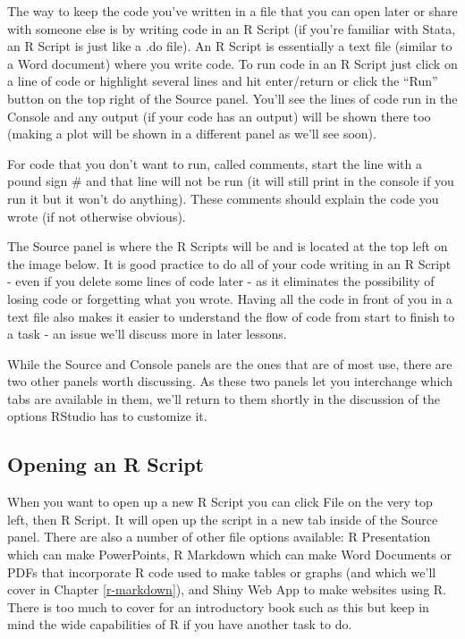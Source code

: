 \documentclass[
  12pt,
]{book}
\begin{document}
The way to keep the code you've written in a file that you can open later or share with someone else is by writing code in an R Script (if you're familiar with Stata, an R Script is just like a .do file). An R Script is essentially a text file (similar to a Word document) where you write code. To run code in an R Script just click on a line of code or highlight several lines and hit enter/return or click the ``Run'' button on the top right of the Source panel. You'll see the lines of code run in the Console and any output (if your code has an output) will be shown there too (making a plot will be shown in a different panel as we'll see soon).

For code that you don't want to run, called comments, start the line with a pound sign \# and that line will not be run (it will still print in the console if you run it but it won't do anything). These comments should explain the code you wrote (if not otherwise obvious).

The Source panel is where the R Scripts will be and is located at the top left on the image below. It is good practice to do all of your code writing in an R Script - even if you delete some lines of code later - as it eliminates the possibility of losing code or forgetting what you wrote. Having all the code in front of you in a text file also makes it easier to understand the flow of code from start to finish to a task - an issue we'll discuss more in later lessons.

While the Source and Console panels are the ones that are of most use, there are two other panels worth discussing. As these two panels let you interchange which tabs are available in them, we'll return to them shortly in the discussion of the options RStudio has to customize it.

\hypertarget{opening-an-r-script}{%
\subsection{Opening an R Script}\label{opening-an-r-script}}

When you want to open up a new R Script you can click File on the very top left, then R Script. It will open up the script in a new tab inside of the Source panel. There are also a number of other file options available: R Presentation which can make PowerPoints, R Markdown which can make Word Documents or PDFs that incorporate R code used to make tables or graphs (and which we'll cover in Chapter \ref{r-markdown}), and Shiny Web App to make websites using R. There is too much to cover for an introductory book such as this but keep in mind the wide capabilities of R if you have another task to do.
\end{document}
